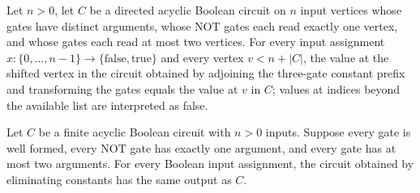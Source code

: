 \begin{theorem}
\label{BoolCircuit.DAGCircuit.deconst_values}
\leanok
{}
Let $n>0$, let $C$ be a directed acyclic Boolean circuit on $n$ input vertices whose
gates have distinct arguments, whose NOT gates each read exactly one vertex, and whose
gates each read at most two vertices. For every input assignment
$x:\{0,\ldots,n-1\}\to\{\mathrm{false},\mathrm{true}\}$ and every vertex $v<n+|C|$, the
value at the shifted vertex in the circuit obtained by adjoining the three-gate constant
prefix and transforming the gates equals the value at $v$ in $C$; values at indices
beyond the available list are interpreted as false.
\end{theorem}

\begin{theorem}
\label{BoolCircuit.DAGCircuit.deconst_eval}
\leanok
{}
Let $C$ be a finite acyclic Boolean circuit with $n>0$ inputs. Suppose every gate is
well formed, every NOT gate has exactly one argument, and every gate has at most two
arguments. For every Boolean input assignment, the circuit obtained by eliminating
constants has the same output as $C$.
\end{theorem}
